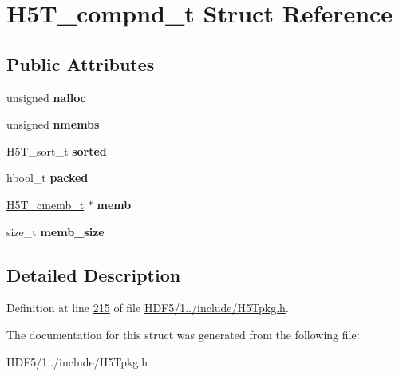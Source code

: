 \hypertarget{struct_h5_t__compnd__t}{}\section{H5\+T\+\_\+compnd\+\_\+t Struct Reference}
\label{struct_h5_t__compnd__t}
\subsection*{Public Attributes}
\begin{DoxyCompactItemize}
\item 
\mbox{\label{struct_h5_t__compnd__t_a2a59f461748d52b10b5852a5c4862972}} 
unsigned {\bfseries nalloc}
\item 
\mbox{\label{struct_h5_t__compnd__t_a880738218235c096f3df57c97869f0fb}} 
unsigned {\bfseries nmembs}
\item 
\mbox{\label{struct_h5_t__compnd__t_a7e5f310d83c86ed977494c6e0f5ef8c4}} 
H5\+T\+\_\+sort\+\_\+t {\bfseries sorted}
\item 
\mbox{\label{struct_h5_t__compnd__t_abc62fc68deff6ff55d662d2e35fac73a}} 
hbool\+\_\+t {\bfseries packed}
\item 
\mbox{\label{struct_h5_t__compnd__t_aee73e9cc0b9730ca610e2d8a54017ebc}} 
\hyperlink{struct_h5_t__cmemb__t}{H5\+T\+\_\+cmemb\+\_\+t} $\ast$ {\bfseries memb}
\item 
\mbox{\label{struct_h5_t__compnd__t_a7ecc0bff38f600a1ade48d65da49c790}} 
size\+\_\+t {\bfseries memb\+\_\+size}
\end{DoxyCompactItemize}


\subsection{Detailed Description}


Definition at line \hyperlink{_h_d_f5_21_810_81_2include_2_h5_tpkg_8h_source_l00215}{215} of file \hyperlink{_h_d_f5_21_810_81_2include_2_h5_tpkg_8h_source}{H\+D\+F5/1../include/\+H5\+Tpkg.\+h}.



The documentation for this struct was generated from the following file\+:\begin{DoxyCompactItemize}
\item 
H\+D\+F5/1../include/\+H5\+Tpkg.\+h\end{DoxyCompactItemize}
